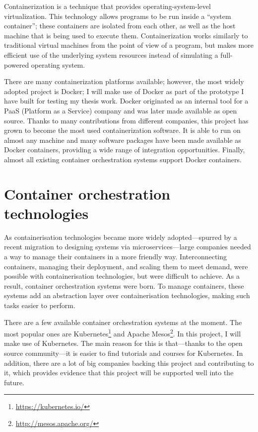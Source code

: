 Containerization is a technique that provides operating-system-level virtualization. This technology allows programs to be run inside a “system container”; these containers are isolated from each other, as well as the host machine that is being used to execute them. Containerization works similarly to traditional virtual machines from the point of view of a program, but makes more efficient use of the underlying system resources instead of simulating a full-powered operating system.

There are many containerization platforms available; however, the most widely adopted project is Docker; I will make use of Docker as part of the prototype I have built for testing my thesis work. Docker originated as an internal tool for a PaaS (Platform as a Service) company and was later made available as open source. Thanks to many contributions from different companies, this project has grown to become the most used containerization software. It is able to run on almost any machine and many software packages have been made available as Docker containers, providing a wide range of integration opportunities. Finally, almost all existing container orchestration systems support Docker containers. 


\section{Container orchestration technologies}

As containerisation technologies became more widely adopted---spurred by a recent migration to designing systems via microservices---large companies needed a way to manage their containers in a more friendly way. Interconnecting containers, managing their deployment, and scaling them to meet demand, were possible with containerisation technologies, but were difficult to achieve. As a result, container orchestration systems were born. To manage containers, these systems add an abstraction layer over containerisation technologies, making such tasks easier to perform.

There are a few available container orchestration systems at the moment. The most popular ones are Kubernetes\footnote{\href{https://kubernetes.io/}{https://kubernetes.io/}} and Apache Mesos\footnote{\href{ http://mesos.apache.org/}{ http://mesos.apache.org/}}. In this project, I will make use of  Kubernetes. The main reason for this is that---thanks to the open source community---it is easier to find tutorials and courses for Kubernetes. In addition, there are a lot of big companies backing this project and contributing to it, which provides evidence that this project will be supported well into the future.

